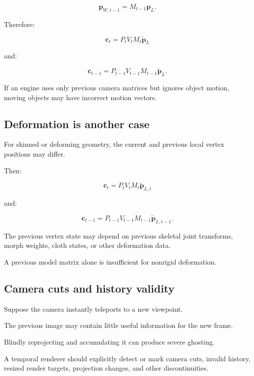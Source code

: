 \[
 \boxed{ \mathbf p_{W,t-1}=M_{t-1}\mathbf p_L }.
\]

Therefore:

\[
 \boxed{ \mathbf c_t=P_tV_tM_t\tilde{\mathbf p}_L }
\]

and:

\[
 \boxed{ \mathbf c_{t-1}= P_{t-1}V_{t-1}M_{t-1}\tilde{\mathbf p}_L }.
\]

If an engine uses only previous camera matrices but ignores object motion, moving objects may have incorrect motion vectors.

\subsection{Deformation is another case}\label{02-foundations-ii-ch036-deformation-is-another-case}

\hypertarget{02-foundations-ii-ch036-deformation-is-another-case}{}

For skinned or deforming geometry, the current and previous local vertex positions may differ.

Then:

\[
 \boxed{ \mathbf c_t=P_tV_tM_t\tilde{\mathbf p}_{L,t} }
\]

and:

\[
 \boxed{ \mathbf c_{t-1}= P_{t-1}V_{t-1}M_{t-1}\tilde{\mathbf p}_{L,t-1} }.
\]

The previous vertex state may depend on previous skeletal joint transforms, morph weights, cloth states, or other deformation data.

A previous model matrix alone is insufficient for nonrigid deformation.

\subsection{Camera cuts and history validity}\label{02-foundations-ii-ch036-camera-cuts-and-history-validity}

\hypertarget{02-foundations-ii-ch036-camera-cuts-and-history-validity}{}

Suppose the camera instantly teleports to a new viewpoint.

The previous image may contain little useful information for the new frame.

Blindly reprojecting and accumulating it can produce severe ghosting.

A temporal renderer should explicitly detect or mark camera cuts, invalid history, resized render targets, projection changes, and other discontinuities.

